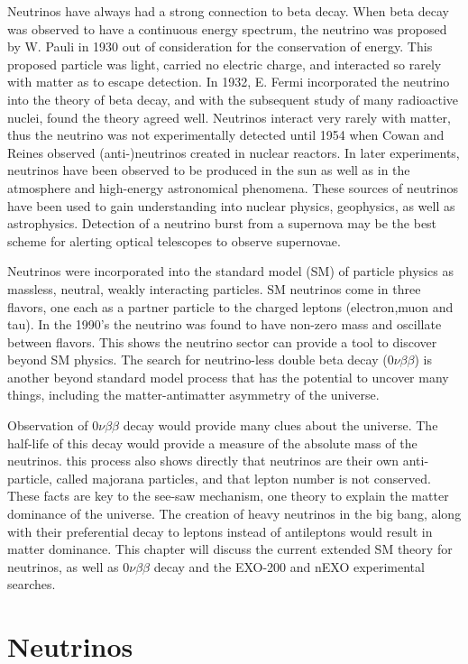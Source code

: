 \documentclass[doctor]{thesis} %
\begin{document}
Neutrinos have always had a strong connection to beta decay. When beta decay was observed to have a continuous energy spectrum, the neutrino was proposed by W. Pauli in 1930 out of consideration for the conservation of energy. This proposed particle was light, carried no electric charge, and interacted so rarely with matter as to escape detection. In 1932, E. Fermi incorporated the neutrino into the theory of beta decay, and with the subsequent study of many radioactive nuclei, found the theory agreed well. Neutrinos interact very rarely with matter, thus the neutrino was not experimentally detected until 1954 when Cowan and Reines observed (anti-)neutrinos created in nuclear reactors. In later experiments, neutrinos have been observed to be produced in the sun as well as in the atmosphere and high-energy astronomical phenomena. These sources of neutrinos have been used to gain understanding into nuclear physics, geophysics, as well as astrophysics. Detection of a neutrino burst from a supernova may be the best scheme for alerting optical telescopes to observe supernovae.\par 
Neutrinos were incorporated into the standard model (SM) of particle physics as massless, neutral, weakly interacting particles. SM neutrinos come in three flavors, one each as a partner particle to the charged leptons (electron,muon and tau). In the 1990's the neutrino was found to have non-zero mass and oscillate between flavors. This shows the neutrino sector can provide a tool to discover beyond SM physics. The search for neutrino-less double beta decay ($0\nu\beta\beta$) is another beyond standard model process that has the potential to uncover many things, including the matter-antimatter asymmetry of the universe.\par
Observation of 0$\nu\beta\beta$ decay would provide many clues about the universe. The half-life of this decay would provide a measure of the absolute mass of the neutrinos. this process also shows directly that neutrinos are their own anti-particle, called majorana particles, and that lepton number is not conserved. These facts are key to the see-saw mechanism, one theory to explain the matter dominance of the universe. The creation of heavy neutrinos in the big bang, along with their preferential decay to leptons instead of antileptons would result in matter dominance. This chapter will discuss the current extended SM theory for neutrinos, as well as $0\nu\beta\beta$ decay and the EXO-200 and nEXO experimental searches.    

   
\section{Neutrinos} 
\end{document}
